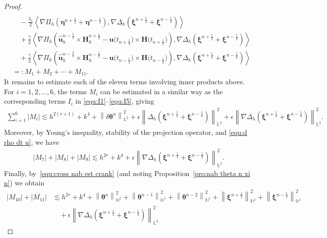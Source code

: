 \documentclass[11pt, reqno]{amsart}
\theoremstyle{definition}
\theoremstyle{remark}
\numberwithin{equation}{section}
\newcommand{\bff}{\boldsymbol}
\newcommand{\bb}{\mathbb}
\newcommand{\norm}[2]{\left\|{#1}\right\|_{#2}}
\newcommand{\inpro}[2]{\left\langle#1,#2\right\rangle}
\newcommand{\abs}[1]{\left|{#1}\right|}
\begin{document}
\begin{proof}
\begin{align}
	\\
	\nonumber
	&\quad
	-
	\frac{\lambda_r}{2} \inpro{\nabla \Pi_h \left(\bff{\eta}^{n+\frac{1}{2}}+\bff{\eta}^{n-\frac{1}{2}}\right)}{\nabla \Delta_h\left(\bff{\xi}^{n+\frac{1}{2}}+\bff{\xi}^{n-\frac{1}{2}}\right)}
	\\
	\nonumber
	&\quad
	+
	\frac{\gamma}{2} \inpro{\nabla \Pi_h\left(\widehat{\bff{u}}_h^{n-\frac{1}{2}} \times \bff{H}_h^{n+\frac{1}{2}} - \bff{u}\big(t_{n+\frac{1}{2}}\big)\times \bff{H}\big(t_{n+\frac{1}{2}}\big)\right)}{\nabla \Delta_h\left(\bff{\xi}^{n+\frac{1}{2}}+\bff{\xi}^{n-\frac{1}{2}}\right)}
	\\
	\nonumber
	&\quad
	+
	\frac{\gamma}{2} \inpro{\nabla \Pi_h\left(\widehat{\bff{u}}_h^{n-\frac{3}{2}} \times \bff{H}_h^{n-\frac{1}{2}} - \bff{u}\big(t_{n-\frac{1}{2}}\big)\times \bff{H}\big(t_{n-\frac{1}{2}}\big)\right)}{\nabla \Delta_h\left(\bff{\xi}^{n+\frac{1}{2}}+\bff{\xi}^{n-\frac{1}{2}}\right)}
	\\
	&=:
	M_1+M_2+\cdots+M_{11}.
\end{align}
It remains to estimate each of the eleven terms involving inner products above. For $i=1,2,\ldots, 6$, the terms $M_i$ can be estimated in a similar way as the corresponding terms $I_i$ in \eqref{equ:I1}--\eqref{equ:I5}, giving
\begin{align*}
	\sum_{i=1}^6 \abs{M_i} \lesssim 
	h^{2(r+1)}+ k^4+ \norm{\delta \bff{\theta}^n}{\bb{L}^2}^2
	+
	\epsilon \norm{\Delta_h\left(\bff{\xi}^{n+\frac{1}{2}}+\bff{\xi}^{n-\frac{1}{2}}\right)}{\bb{L}^2}^2
	+
	\epsilon \norm{\nabla \Delta_h\left(\bff{\xi}^{n+\frac{1}{2}}+\bff{\xi}^{n-\frac{1}{2}}\right)}{\bb{L}^2}^2.
\end{align*}
Moreover, by Young's inequality, stability of the projection operator, and \eqref{equ:d rho dt u}, we have
\begin{align*}
	\abs{M_7}+\abs{M_8}+\abs{M_9} 
	\lesssim
	h^{2r}+k^4 + \epsilon \norm{\nabla \Delta_h\left(\bff{\xi}^{n+\frac{1}{2}}+\bff{\xi}^{n-\frac{1}{2}}\right)}{\bb{L}^2}^2.
\end{align*}
Finally, by~\eqref{equ:cross nab est crank} (and noting Proposition~\ref{pro:nab theta n xi n}) we obtain
\begin{align*}
	\abs{M_{10}} + \abs{M_{11}}
	&\lesssim
	h^{2r}
	+
	k^4
	+
	\norm{\bff{\theta}^n}{\bb{H}^1}^2
	+
	\norm{\bff{\theta}^{n-1}}{\bb{H}^1}^2
	+
	\norm{\bff{\theta}^{n-2}}{\bb{H}^1}^2
	+
	\norm{\bff{\xi}^{n+\frac12}}{\bb{H}^1}^2
	+
	\norm{\bff{\xi}^{n-\frac12}}{\bb{H}^1}^2
	\\
	&\quad
	+
	\epsilon \norm{\nabla \Delta_h\left(\bff{\xi}^{n+\frac{1}{2}}+\bff{\xi}^{n-\frac{1}{2}}\right)}{\bb{L}^2}^2

\end{align*}
\end{proof}
\end{document}
